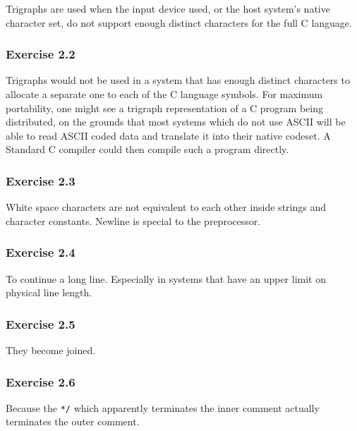    Trigraphs are used when the input device used, or the host system's
    native character set, do not support enough distinct characters for the
    full C language.


  

  \subsubsection*{Exercise 2.2}

   Trigraphs would not be used in a system that has enough distinct
    characters to allocate a separate one to each of the C language symbols.
    For maximum portability, one might see a trigraph representation of
    a C program being distributed, on the grounds that most systems which do
    not use ASCII will be able to read ASCII coded data and translate it into
    their native codeset.  A Standard C compiler could then compile such
    a program directly.


  

  \subsubsection*{Exercise 2.3}

   White space characters are not equivalent to each other inside strings
    and character constants. Newline is special to the preprocessor.


  

  \subsubsection*{Exercise 2.4}

   To continue a long line. Especially in systems that have an upper limit
    on physical line length.


  

  \subsubsection*{Exercise 2.5}

   They become joined.


  

  \subsubsection*{Exercise 2.6}

   Because the \texttt{*/} which apparently terminates the inner comment
    actually terminates the outer comment.


